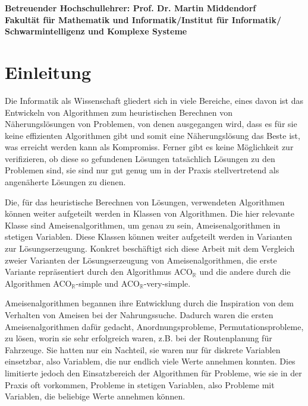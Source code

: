 \documentclass[fontsize=12, a4aper]{scrartcl}
\begin{document}
	\vfill
	
	\begin{flushleft}
		
		\textbf{Betreuender Hochschullehrer: Prof. Dr. Martin Middendorf}\\
		\textbf{\hspace{1mm} Fakultät für Mathematik und Informatik/Institut für Informatik/}\\
		\textbf{\hspace{1mm} Schwarmintelligenz und Komplexe Systeme}
		
	\end{flushleft}
	
	
	\newpage
	
	\tableofcontents
	\newpage
	
	\section{Einleitung}
	
	Die Informatik als Wissenschaft gliedert sich in viele Bereiche, eines davon ist das Entwickeln von Algorithmen zum heuristischen Berechnen von Näherungslösungen von Problemen, von denen ausgegangen wird, dass es für sie keine effizienten Algorithmen gibt und somit eine Näherungslösung das Beste ist, was erreicht werden kann als Kompromiss. Ferner gibt es keine Möglichkeit zur verifizieren, ob diese so gefundenen Lösungen tatsächlich Lösungen zu den Problemen sind, sie sind nur gut genug um in der Praxis stellvertretend als angenäherte Lösungen zu dienen.\hfill\newline
	
	Die, für das heuristische Berechnen von Lösungen, verwendeten Algorithmen können weiter aufgeteilt werden in Klassen von Algorithmen. Die hier relevante Klasse sind Ameisenalgorithmen, um genau zu sein, Ameisenalgorithmen in stetigen Variablen. Diese Klassen können weiter aufgeteilt werden in Varianten zur Lösungserzeugung. Konkret beschäftigt sich diese Arbeit mit dem Vergleich zweier Varianten der Lösungserzeugung von Ameisenalgorithmen, die erste Variante repräsentiert durch den Algorithmus ACO\(_{\mathbb{R}}\) und die andere durch die Algorithmen ACO\(_{\mathbb{R}}\)-simple und ACO\(_{\mathbb{R}}\)-very-simple.\hfill\newline
	
	Ameisenalgorithmen begannen ihre Entwicklung durch die Inspiration von dem Verhalten von Ameisen bei der Nahrungssuche. Dadurch waren die ersten Ameisenalgorithmen dafür gedacht, Anordnungsprobleme, Permutationsprobleme, zu lösen, worin sie sehr erfolgreich waren, z.B. bei der Routenplanung für Fahrzeuge. Sie hatten nur ein Nachteil, sie waren nur für diskrete Variablen einsetzbar, also Variablem, die nur endlich viele Werte annehmen konnten. Dies limitierte jedoch den Einsatzbereich der Algorithmen für Probleme, wie sie in der Praxis oft vorkommen, Probleme in stetigen Variablen, also Probleme mit Variablen, die beliebige Werte annehmen können.\hfill\newline
	
\end{document}
